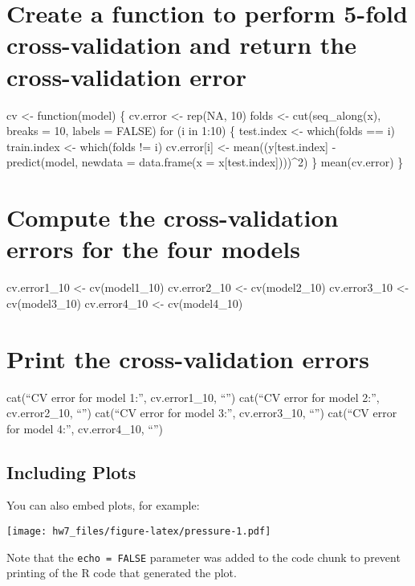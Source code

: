 \documentclass[
]{article}
\begin{document}
\hypertarget{create-a-function-to-perform-5-fold-cross-validation-and-return-the-cross-validation-error-1}{%
\section{Create a function to perform 5-fold cross-validation and return
the cross-validation
error}\label{create-a-function-to-perform-5-fold-cross-validation-and-return-the-cross-validation-error-1}}

cv \textless- function(model) \{ cv.error \textless- rep(NA, 10) folds
\textless- cut(seq\_along(x), breaks = 10, labels = FALSE) for (i in
1:10) \{ test.index \textless- which(folds == i) train.index \textless-
which(folds != i) cv.error{[}i{]} \textless- mean((y{[}test.index{]} -
predict(model, newdata = data.frame(x = x{[}test.index{]})))\^{}2) \}
mean(cv.error) \}

\hypertarget{compute-the-cross-validation-errors-for-the-four-models-1}{%
\section{Compute the cross-validation errors for the four
models}\label{compute-the-cross-validation-errors-for-the-four-models-1}}

cv.error1\_10 \textless- cv(model1\_10) cv.error2\_10 \textless-
cv(model2\_10) cv.error3\_10 \textless- cv(model3\_10) cv.error4\_10
\textless- cv(model4\_10)

\hypertarget{print-the-cross-validation-errors-1}{%
\section{Print the cross-validation
errors}\label{print-the-cross-validation-errors-1}}

cat(``CV error for model 1:'', cv.error1\_10, ``\n'') cat(``CV error for
model 2:'', cv.error2\_10, ``\n'') cat(``CV error for model 3:'',
cv.error3\_10, ``\n'') cat(``CV error for model 4:'', cv.error4\_10,
``\n'')

\hypertarget{including-plots}{%
\subsection{Including Plots}\label{including-plots}}

You can also embed plots, for example:

\texttt{[image: hw7\_files/figure-latex/pressure-1.pdf]}

Note that the \texttt{echo\ =\ FALSE} parameter was added to the code
chunk to prevent printing of the R code that generated the plot.
\end{document}
